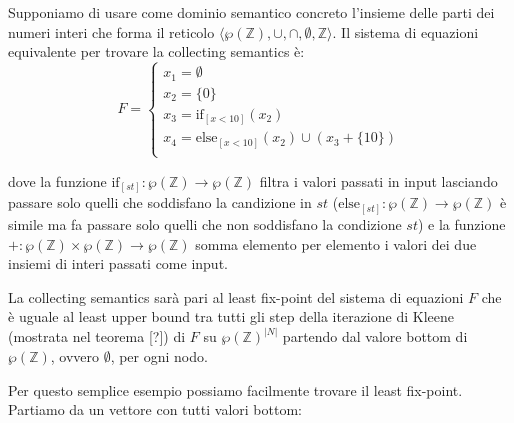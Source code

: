 \begin{example}
\begin{figure}
\begin{minipage}{0.5\textwidth}
\begin{center}
\end{center}
\end{minipage}
\caption{}
\label{fig:codiceEsempio1}
\end{figure}

Supponiamo di usare come dominio semantico concreto l'insieme delle parti dei numeri interi che forma il reticolo \(\langle\wp(\mathbb{Z}), \cup, \cap, \emptyset, \mathbb{Z}\rangle\).
Il sistema di equazioni equivalente per trovare la collecting semantics è:
\[
F = 
\begin{cases}
   x_1 = \emptyset \\ 
   x_2 = \{0\} \\
   x_3 = \textrm{if}_{[x < 10]}(x_2) \\
   x_4 = \textrm{else}_{[x < 10]}(x_2) \cup (x_3 + \{10\}) \\
\end{cases}
\]

dove la funzione \(\textrm{if}_{[st]}:\wp(\mathbb{Z})\rightarrow\wp(\mathbb{Z})\) filtra i valori passati in input lasciando passare solo quelli che soddisfano la candizione in \(st\) (\(\textrm{else}_{[st]}:\wp(\mathbb{Z})\rightarrow\wp(\mathbb{Z})\) è simile ma fa passare solo quelli che non soddisfano la condizione \(st\)) e la funzione \(+:\wp(\mathbb{Z})\times\wp(\mathbb{Z})\rightarrow\wp(\mathbb{Z})\) somma elemento per elemento i valori dei due insiemi di interi passati come input. 

La collecting semantics sarà pari al least fix-point del sistema di equazioni \(F\) che è uguale al least upper bound tra tutti gli step della iterazione di Kleene (mostrata nel teorema [?]) di \(F\) su \(\wp(\mathbb{Z})^{|N|}\) partendo dal valore bottom di \(\wp(\mathbb{Z})\), ovvero \(\emptyset\), per ogni nodo.  

Per questo semplice esempio possiamo facilmente trovare il least fix-point. Partiamo da un vettore con tutti valori bottom:


\end{example}
